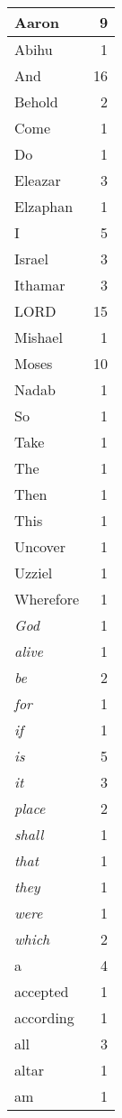 \begin{center}
\begin{longtable}{l|r}
\hline \hline
\endlastfoot
Aaron & 9 \\ \hline
Abihu & 1 \\ \hline
And & 16 \\ \hline
Behold & 2 \\ \hline
Come & 1 \\ \hline
Do & 1 \\ \hline
Eleazar & 3 \\ \hline
Elzaphan & 1 \\ \hline
I & 5 \\ \hline
Israel & 3 \\ \hline
Ithamar & 3 \\ \hline
LORD & 15 \\ \hline
Mishael & 1 \\ \hline
Moses & 10 \\ \hline
Nadab & 1 \\ \hline
So & 1 \\ \hline
Take & 1 \\ \hline
The & 1 \\ \hline
Then & 1 \\ \hline
This & 1 \\ \hline
Uncover & 1 \\ \hline
Uzziel & 1 \\ \hline
Wherefore & 1 \\ \hline
\emph{God} & 1 \\ \hline
\emph{alive} & 1 \\ \hline
\emph{be} & 2 \\ \hline
\emph{for} & 1 \\ \hline
\emph{if} & 1 \\ \hline
\emph{is} & 5 \\ \hline
\emph{it} & 3 \\ \hline
\emph{place} & 2 \\ \hline
\emph{shall} & 1 \\ \hline
\emph{that} & 1 \\ \hline
\emph{they} & 1 \\ \hline
\emph{were} & 1 \\ \hline
\emph{which} & 2 \\ \hline
a & 4 \\ \hline
accepted & 1 \\ \hline
according & 1 \\ \hline
all & 3 \\ \hline
altar & 1 \\ \hline
am & 1 \\ \hline

\end{longtable}
\end{center}
